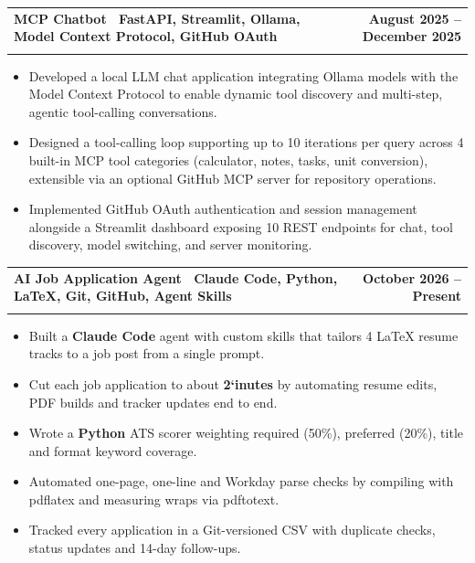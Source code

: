 \documentclass[letterpaper,11pt]{article}
\makeatletter
\newcommand{\resumeItem}[1]{\item\small{#1 \vspace{-4pt}}}  %
\newcommand{\resumeSubheading}[4]{
    \vspace{-2pt}\item
    \begin{tabular*}{1.0\textwidth}[t]{l@{\extracolsep{\fill}}r}
        \textbf{#1} & \textbf{\small #2} \\
        \textit{\small#3} & \textit{\small #4}
    \end{tabular*}\vspace{-7pt}
}
\newcommand{\resumeItemListStart}{\begin{itemize}}
\newcommand{\resumeItemListEnd}{\end{itemize}\vspace{-7pt}}  %
\makeatother
\begin{document}
\resumeSubheading
{\textbf{MCP Chatbot} \textnormal{ \textbar\ {FastAPI, Streamlit, Ollama, Model Context Protocol, GitHub OAuth}}}{August 2025 -- December 2025}{}{}
\vspace{-0.6cm}
\resumeItemListStart
\resumeItem{Developed a local LLM chat application integrating Ollama models with the Model Context Protocol to enable dynamic tool discovery and multi-step, agentic tool-calling conversations.}
\vspace{0.15cm}
\resumeItem{Designed a tool-calling loop supporting up to 10 iterations per query across 4 built-in MCP tool categories (calculator, notes, tasks, unit conversion), extensible via an optional GitHub MCP server for repository operations.}
\vspace{0.15cm}
\resumeItem{Implemented GitHub OAuth authentication and session management alongside a Streamlit dashboard exposing 10 REST endpoints for chat, tool discovery, model switching, and server monitoring.}
\vspace{0.15cm}
\resumeItemListEnd

\resumeSubheading
{\textbf{AI Job Application Agent} \textnormal{\textbar\ {Claude Code, Python, LaTeX, Git, GitHub, Agent Skills}}}{October 2026 -- Present}{}{}
\vspace{-0.6cm}
\resumeItemListStart
\resumeItem{Built a \textbf{Claude Code} agent with custom skills that tailors 4 LaTeX resume tracks to a job post from a single prompt.}
\vspace{0.15cm}
\resumeItem{Cut each job application to about \textbf{2`inutes} by automating resume edits, PDF builds and tracker updates end to end.}
\vspace{0.15cm}
\resumeItem{Wrote a \textbf{Python} ATS scorer weighting required (50\%), preferred (20\%), title and format keyword coverage.}
\vspace{0.15cm}
\resumeItem{Automated one-page, one-line and Workday parse checks by compiling with pdflatex and measuring wraps via pdftotext.}
\vspace{0.15cm}
\resumeItem{Tracked every application in a Git-versioned CSV with duplicate checks, status updates and 14-day follow-ups.}
\vspace{0.15cm}
\resumeItemListEnd
\end{document}
